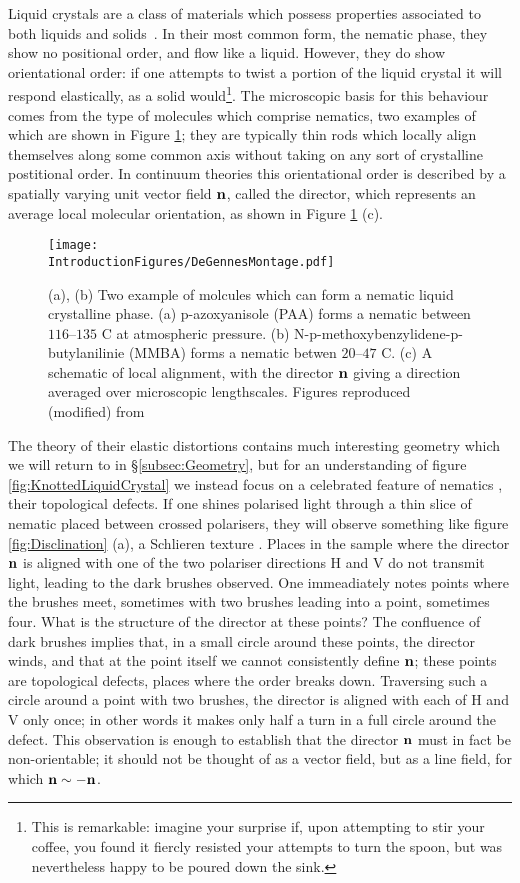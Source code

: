 Liquid crystals are a class of materials which possess properties associated to both liquids and solids~\citep{deGennes1992}. In their most common form, the nematic phase, they show no positional order, and flow like a liquid. However, they do show orientational order: if one attempts to twist a portion of the liquid crystal it will respond elastically, as a solid would\footnote{This is remarkable: imagine your surprise if, upon attempting to stir your coffee, you found it fiercly resisted your attempts to turn the spoon, but was nevertheless happy to be poured down the sink.}. The microscopic basis for this behaviour comes from the type of molecules which comprise nematics, two examples of which are shown in Figure \ref{fig:DeGennesMontage}; they are typically thin rods which locally align themselves along some common axis without taking on any sort of crystalline postitional order. In continuum theories this orientational order is described by a spatially varying unit vector field $\bf n$, called the director, which represents an average local molecular orientation, as shown in Figure \ref{fig:DeGennesMontage} (c).
\begin{figure}[htbp]
\centering
\texttt{[image: \\IntroductionFigures/DeGennesMontage.pdf]}
\caption{(a), (b) Two example of molcules which can form a nematic liquid crystalline phase. (a) p-azoxyanisole (PAA) forms a nematic between $116$--$135$ C at atmospheric pressure. (b) N-p-methoxybenzylidene-p-butylanilinie (MMBA) forms a nematic betwen $20$--$47$ C. (c) A schematic of local alignment, with the director $\bf n$ giving a direction averaged over microscopic lengthscales. Figures reproduced (modified) from \citep{deGennes1992}}
\label{fig:DeGennesMontage}
\end{figure}

The theory of their elastic distortions contains much interesting geometry which we will return to in \S \ref{subsec:Geometry}, but for an understanding of figure \ref{fig:KnottedLiquidCrystal} we instead focus on a celebrated feature of nematics \citep{Frank1958}, their topological defects. If one shines polarised light through a thin slice of nematic placed between crossed polarisers, they will observe something like figure \ref{fig:Disclination} (a), a Schlieren texture \citep{deGennes1992}. Places in the sample where the director $\bf n$ is aligned with one of the two polariser directions H and V do not transmit light, leading to the dark brushes observed. One immeadiately notes points where the brushes meet, sometimes with two brushes leading into a point, sometimes four. What is the structure of the director at these points? The confluence of dark brushes implies that, in a small circle around these points, the director winds, and that at the point itself we cannot consistently define $\bf n$; these points are topological defects, places where the order breaks down. Traversing such a circle around a point with two brushes, the director is aligned with each of H and V only once; in other words it makes only half a turn in a full circle around the defect. This observation is enough to establish that the director $\bf{n}$ must in fact be non-orientable; it should not be thought of as a vector field, but as a line field, for which $\bf n \sim - \bf n$.


